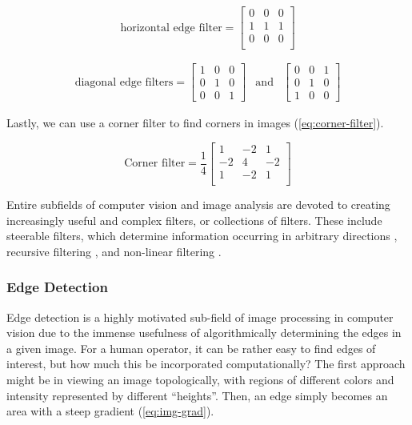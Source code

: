 \begin{equation}
    \text{horizontal edge filter} =\begin{bmatrix}
        0 & 0 & 0 \\
        1 & 1 & 1 \\
        0 & 0 & 0 \\
    \end{bmatrix}
    \label{eq:horiz-edge-filter}
\end{equation}

\begin{equation}
    \begin{aligned}
        \text{diagonal edge filters} = \begin{bmatrix}
            1 & 0 & 0 \\
            0 & 1 & 0\\
            0 & 0 & 1
        \end{bmatrix}& \text{and} & 
        \begin{bmatrix}
            0 & 0 & 1 \\
            0 & 1 & 0\\
            1 & 0 & 0
        \end{bmatrix}
    \end{aligned}
    \label{eq:diag-edge-filter}
\end{equation}

Lastly, we can use a corner filter to find corners in images (\cref{eq:corner-filter}).

\begin{equation}
    \text{Corner filter} = \frac{1}{4}\begin{bmatrix}
        1 & -2 & 1 \\
        -2 & 4 & -2 \\
        1 & -2 & 1 \\
    \end{bmatrix}
    \label{eq:corner-filter}
\end{equation}

Entire subfields of computer vision and image analysis are devoted to creating increasingly useful and complex filters, or collections of filters. These include steerable filters, which determine information occurring in arbitrary directions \cite{freemanSteerableFiltersLocal1992}, recursive filtering \cite{nielsenRegularizationScalespaceEdge1996}, and non-linear filtering \cite{tomasiBilateralFilteringGray1998}.

\subsubsection{Edge Detection}
Edge detection is a highly motivated sub-field of image processing in computer vision due to the immense usefulness of algorithmically determining the edges in a given image. For a human operator, it can be rather easy to find edges of interest, but how much this be incorporated computationally? The first approach might be in viewing an image topologically, with regions of different colors and intensity represented by different ``heights''. Then, an edge simply becomes an area with a steep gradient (\cref{eq:img-grad}).


